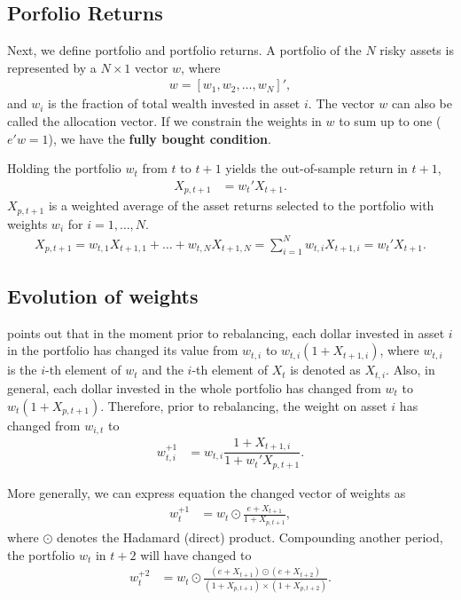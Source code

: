 \documentclass[preprint, doubleblind, authoryear,10pt]{elsarticle}
\begin{document}
\subsection*{Porfolio Returns}

Next, we define portfolio and portfolio returns.
A portfolio of the $N$ risky assets is represented by a $N\times 1$ vector $w$, where
\begin{align*}
	w = \left[ w_1, w_2 , \dots, w_N \right]',
\end{align*}
and $w_{i}$ is the fraction of total wealth invested in asset $i$.
The vector $w$ can also be called the allocation vector.
If we constrain the weights in $w$ to sum up to one ($e'w=1$), we have the \textbf{fully bought condition}.

Holding the portfolio $w_{t}$ from $t$ to $t+1$ yields the out-of-sample return in $t+1$,
\begin{align} \label{eq:retport}
	X_{p,t+1} &= w_{t}'X_{t+1}.
\end{align}
$X_{p,t+1}$ is a weighted average of the asset returns selected to the portfolio with weights $w_{i}$ for $i=1,\dots,N$.
\begin{align*} \label{ret_port}
	X_{p,t+1} = w_{t,1} X_{t+1,1} + \dots + w_{t,N} X_{t+1,N}
	= \sum_{i=1}^{N} w_{t,i} X_{t+1,i} = w_{t}'X_{t+1}.
\end{align*}

\subsection*{Evolution of weights}

\cite{liu-2009} points out that in the moment prior to rebalancing, each dollar invested in asset $i$ in the portfolio has changed its value from $w_{t,i}$ to $w_{t,i}(1+X_{t+1,i})$, where $w_{t,i}$ is the $i$-th element of $w_{t}$ and the $i$-th element of $X_{t}$ is denoted as $X_{t,i}$.
Also, in general, each dollar invested in the whole portfolio has changed from $w_{t}$ to $w_{t}(1+X_{p,t+1})$.
Therefore, prior to rebalancing, the weight on asset $i$ has changed from $w_{i,t}$ to 
\begin{align*}
	w_{t,i}^{+1} &= w_{t,i} \dfrac{1+X_{t+1,i}}{1+w_{t}'X_{p,t+1}}.
\end{align*}

More generally, we can express equation the changed vector of weights as
\begin{align}
	\label{eq:wplus1}
	w_{t}^{+1} &= w_{t} \odot \frac{e + X_{t+1}}{1 + X_{p,t+1}},
\end{align}
where $\odot$ denotes the Hadamard (direct) product.
Compounding another period, the portfolio $w_{t}$ in $t+2$ will have changed to
\begin{align*}
	w_{t}^{+2} &= w_{t} \odot 
	\frac{(e + X_{t+1})\odot(e + X_{t+2})}{(1 + X_{p,t+1})\times(1 + X_{p,t+2})}.
\end{align*}
\end{document}
